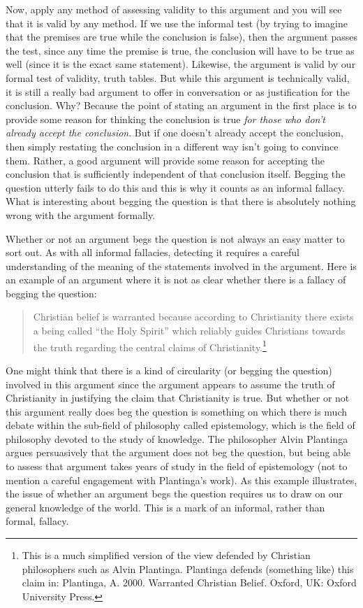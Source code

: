 Now, apply any method of assessing validity to this argument and you will see that it is valid by any method. If we use the informal test (by trying to imagine that the premises are true while the conclusion is false), then the argument passes the test, since any time the premise is true, the conclusion will have to be true as well (since it is the exact same statement). Likewise, the argument is valid by our formal test of validity, truth tables. But while this argument is technically valid, it is still a really bad argument to offer in conversation or as justification for the conclusion. Why? Because the point of stating an argument in the first place is to provide some reason for thinking the conclusion is true \emph{for those who don't already accept the conclusion}. But if one doesn't already accept the conclusion, then simply restating the conclusion in a different way isn't going to convince them. Rather, a good argument will provide some reason for accepting the conclusion that is sufficiently independent of that conclusion itself. Begging the question utterly fails to do this and this is why it counts as an informal fallacy. What is interesting about begging the question is that there is absolutely nothing wrong with the argument formally.

Whether or not an argument begs the question is not always an easy matter to sort out. As with all informal fallacies, detecting it requires a careful understanding of the meaning of the statements involved in the argument. Here is an example of an argument where it is not as clear whether there is a fallacy of begging the question:
\begin{quote}
Christian belief is warranted because according to Christianity there exists a being called ``the Holy Spirit'' which reliably guides Christians towards the truth regarding the central claims of Christianity.\footnote{This is a much simplified version of the view defended by Christian philosophers such as Alvin Plantinga. Plantinga defends (something like) this claim in: Plantinga, A. 2000. Warranted Christian Belief. Oxford, UK: Oxford University Press.}
\end{quote}

One might think that there is a kind of circularity (or begging the question) involved in this argument since the argument appears to assume the truth of Christianity in justifying the claim that Christianity is true. But whether or not this argument really does beg the question is something on which there is much debate within the sub-field of philosophy called epistemology, which is the field of philosophy devoted to the study of knowledge. The philosopher Alvin Plantinga argues persuasively that the argument does not beg the question, but being able to assess that argument takes years of study in the field of epistemology (not to mention a careful engagement with Plantinga's work). As this example illustrates, the issue of whether an argument begs the question requires us to draw on our general knowledge of the world. This is a mark of an informal, rather than formal, fallacy.

